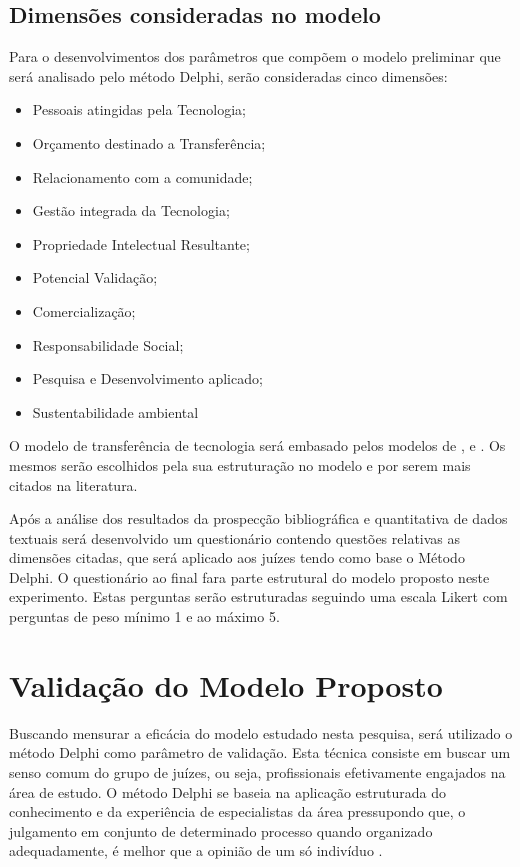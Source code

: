 \subsection{Dimensões consideradas no modelo}


Para o desenvolvimentos dos parâmetros que compõem o modelo preliminar que será analisado pelo método Delphi, serão consideradas cinco dimensões:

\begin{multicols}{2}
\centering
    \begin{itemize}
    \item{Pessoais atingidas pela Tecnologia;}
\item{Orçamento destinado a Transferência;}
\item{Relacionamento com a comunidade;}
\item{Gestão integrada da Tecnologia;}
\item{Propriedade Intelectual Resultante;}
\item{Potencial Validação;}
\item{Comercialização;}
\item{Responsabilidade Social;}
\item{Pesquisa e Desenvolvimento aplicado;}
\item{Sustentabilidade ambiental}
\end{itemize}
\end{multicols}


O modelo de transferência de tecnologia será embasado pelos modelos de ,  e . Os mesmos serão escolhidos pela sua estruturação no modelo e por serem mais citados na literatura.

Após a análise dos resultados da prospecção bibliográfica e  quantitativa de dados textuais será desenvolvido um questionário contendo questões relativas as dimensões citadas, que será aplicado aos juízes tendo como base o Método Delphi. O questionário ao final fara parte estrutural do modelo proposto neste experimento. Estas perguntas serão estruturadas seguindo uma escala Likert com perguntas de peso mínimo 1 e ao máximo 5. 


\section{Validação do Modelo Proposto}


Buscando mensurar a eficácia do modelo estudado nesta pesquisa, será utilizado o método Delphi como parâmetro de validação. Esta técnica consiste em buscar um senso comum do grupo de juízes, ou seja, profissionais efetivamente engajados na área de estudo. O método Delphi se baseia na aplicação estruturada do conhecimento e da experiência de especialistas da área pressupondo que, o julgamento em conjunto de determinado processo quando organizado adequadamente, é melhor que a opinião de um só indivíduo \cite{Faro1997TecnicaEnfermagem,Santiago2012MatrizUrbanos}.


